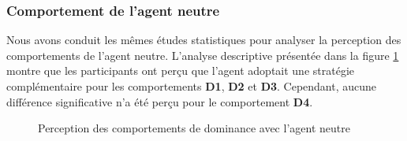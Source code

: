	\subsubsection{Comportement de l'agent neutre}
	
	Nous avons conduit les mêmes études statistiques pour analyser la perception des comportements de l'agent neutre. L'analyse descriptive présentée dans la figure \ref{fig:neutre} montre que les participants ont perçu que l'agent adoptait une stratégie complémentaire pour les comportements \textbf{D1}, \textbf{D2} et \textbf{D3}. Cependant, aucune différence significative n'a été perçu pour le comportement \textbf{D4}.
	
	\begin{figure}[h]
		\centering
		
		\caption{Perception des comportements de dominance avec l'agent neutre}
		\label{fig:neutre}
	\end{figure}
	
